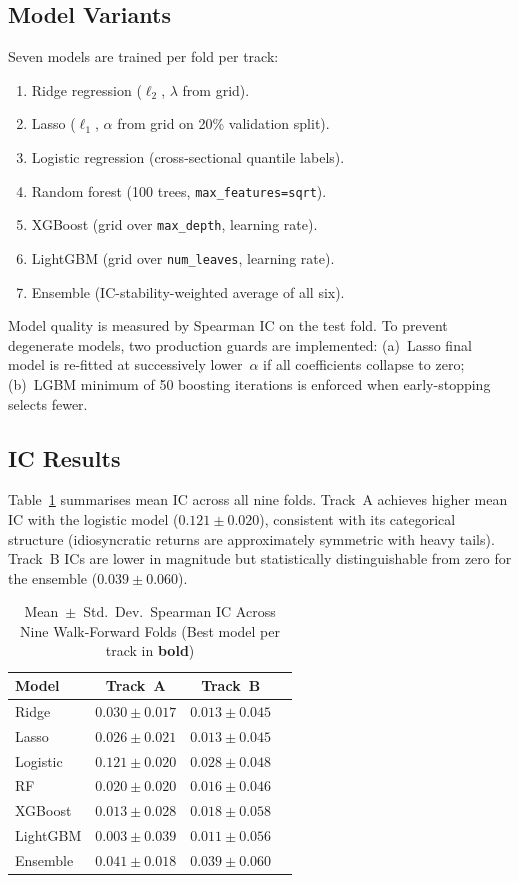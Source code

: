 \documentclass[journal]{IEEEtran}
\begin{document}
\subsection{Model Variants}
Seven models are trained per fold per track:
\begin{enumerate}
  \item Ridge regression ($\ell_2$, $\lambda$ from grid).
  \item Lasso ($\ell_1$, $\alpha$ from grid on 20\% validation split).
  \item Logistic regression (cross-sectional quantile labels).
  \item Random forest (100 trees, \texttt{max\_features=\textquotesingle sqrt\textquotesingle}).
  \item XGBoost (grid over \texttt{max\_depth}, learning rate).
  \item LightGBM (grid over \texttt{num\_leaves}, learning rate).
  \item Ensemble (IC-stability-weighted average of all six).
\end{enumerate}

Model quality is measured by Spearman IC on the test fold.
To prevent degenerate models, two production guards are implemented:
(a)~Lasso final model is re-fitted at successively lower~$\alpha$
if all coefficients collapse to zero;
(b)~LGBM minimum of 50 boosting iterations is enforced when
early-stopping selects fewer.

\subsection{IC Results}
Table~\ref{tab:ic_summary} summarises mean IC across all nine folds.
Track~A achieves higher mean IC with the logistic model
($0.121 \pm 0.020$), consistent with its categorical structure
(idiosyncratic returns are approximately symmetric with heavy tails).
Track~B ICs are lower in magnitude but statistically distinguishable
from zero for the ensemble ($0.039 \pm 0.060$).

\begin{table}[t]
\centering
\caption{Mean~$\pm$~Std.~Dev.\ Spearman IC Across Nine Walk-Forward Folds
         (Best model per track in \textbf{bold})}
\label{tab:ic_summary}
\begin{tabular}{lccc}
\toprule
Model & Track~A & Track~B \\
\midrule
Ridge    & $0.030 \pm 0.017$ & $0.013 \pm 0.045$ \\
Lasso    & $0.026 \pm 0.021$ & $0.013 \pm 0.045$ \\
Logistic & $\mathbf{0.121 \pm 0.020}$ & $0.028 \pm 0.048$ \\
RF       & $0.020 \pm 0.020$ & $0.016 \pm 0.046$ \\
XGBoost  & $0.013 \pm 0.028$ & $0.018 \pm 0.058$ \\
LightGBM & $0.003 \pm 0.039$ & $0.011 \pm 0.056$ \\
Ensemble & $0.041 \pm 0.018$ & $\mathbf{0.039 \pm 0.060}$ \\
\bottomrule
\end{tabular}
\end{table}
\end{document}
